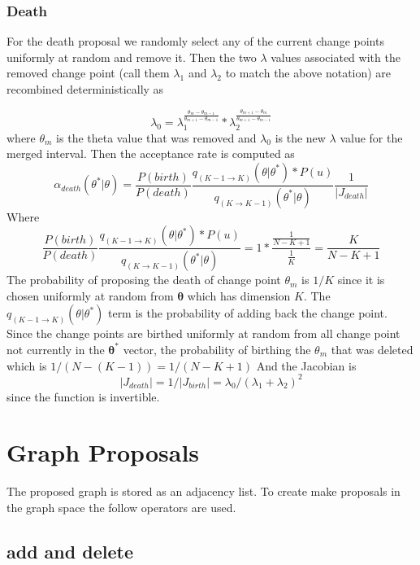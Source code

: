 \documentclass[11pt,a4paper]{article}
\numberwithin{equation}{section}
\begin{document}
\hypertarget{death}{%
\subsubsection{Death}\label{death}}

For the death proposal we randomly select any of the current change
points uniformly at random and remove it. Then the two \(\lambda\)
values associated with the removed change point (call them \(\lambda_1\)
and \(\lambda_2\) to match the above notation) are recombined
deterministically as

\[ \lambda_0 =\lambda_1^{\frac{\theta_m-\theta_{m-1}}{\theta_{m+1}-\theta_{m-1}}}*\lambda_2^{\frac{\theta_{m+1}-\theta_{m}}{\theta_{m+1}-\theta_{m-1}}} \]
where \(\theta_m\) is the theta value that was removed and \(\lambda_0\)
is the new \(\lambda\) value for the merged interval. Then the
acceptance rate is computed as
\[\alpha_{death}(\theta^*|\theta) = \frac{P(birth)}{P(death)}\frac{q_{(K-1\rightarrow K)}(\theta|\theta^*)*P(u)}{q_{(K\rightarrow K - 1)}(\theta^*|\theta)}\frac{1}{|J_{death}|}\]
Where
\[ \frac{P(birth)}{P(death)}\frac{q_{(K-1\rightarrow K)}(\theta|\theta^*)*P(u)}{q_{(K\rightarrow K - 1)}(\theta^*|\theta)} = 1*\frac{\frac{1}{N-K+1}}{\frac{1}{K}} = \frac{K}{N-K+1} \]
The probability of proposing the death of change point \(\theta_m\) is
\(1/K\) since it is chosen uniformly at random from
\(\boldsymbol{\theta}\) which has dimension \(K\). The
\(q_{(K-1\rightarrow K)}(\theta|\theta^*)\) term is the probability of
adding back the change point. Since the change points are birthed
uniformly at random from all change point not currently in the
\(\boldsymbol{\theta^*}\) vector, the probability of birthing the
\(\theta_m\) that was deleted which is \(1/(N-(K-1)) = 1/(N-K+1)\) And
the Jacobian is
\[|J_{death}| = 1/|J_{birth}| = \lambda_0/(\lambda_1 + \lambda_2)^2\]
since the function is invertible.

\hypertarget{graph-proposals}{%
\section{Graph Proposals}\label{graph-proposals}}

The proposed graph is stored as an adjacency list. To create make
proposals in the graph space the follow operators are used.

\hypertarget{add-and-delete}{%
\subsection{add and delete}\label{add-and-delete}}
\end{document}
